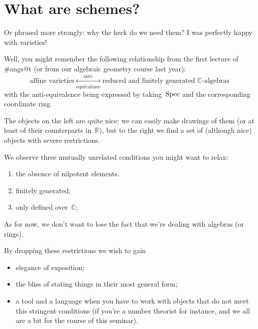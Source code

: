 \section{What are schemes?}

Or phrased more strongly: why the heck do we need them? I was perfectly happy with varieties!

Well, you might remember the following relationship from the first lecture of \#angs@t (or from our algebraic geometry course last year):
\begin{equation}
  \text{affine varieties} \underset{\text{equivalence}}{\overset{\text{anti-}}{\longleftrightarrow}} \text{reduced and finitely generated $\mathbb{C}$-algebras}
  \label{equation:variety-anti-equivalence}
\end{equation}
with the anti-equivalence being expressed by taking~$\operatorname{Spec}$ and the corresponding coordinate ring.

The objects on the left are quite nice: we can easily make drawings of them (or at least of their counterparts in~$\mathbb{R}$), but to the right we find a set of (although nice) objects with severe restrictions.

We observe three mutually unrelated conditions you might want to relax:
\begin{enumerate}
  \item the absence of nilpotent elements.
  \item finitely generated;
  \item only defined over~$\mathbb{C}$;
\end{enumerate}
As for now, we don't want to lose the fact that we're dealing with algebras (or rings).

By dropping these restrictions we wish to gain
\begin{itemize}
  \item elegance of exposition;
  \item the bliss of stating things in their most general form;
  \item a tool and a language when you have to work with objects that do not meet this stringent conditions (if you're a number theorist for instance, and we all are a bit for the course of this seminar).
\end{itemize}

